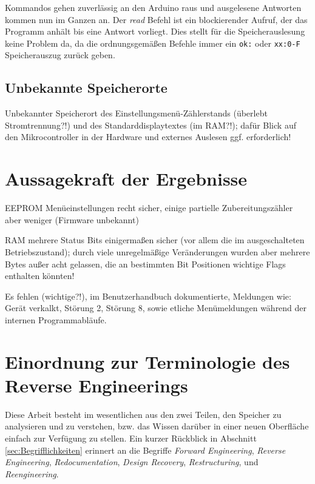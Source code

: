 Kommandos gehen zuverlässig an den Arduino raus und ausgelesene Antworten kommen nun im Ganzen an. Der \textit{read} Befehl ist ein blockierender Aufruf, der das Programm anhält bis eine Antwort vorliegt. Dies stellt für die Speicherauslesung keine Problem da, da die ordnungsgemäßen Befehle immer ein \texttt{ok:} oder \texttt{xx:0-F} Speicherauszug zurück geben.

\subsection{Unbekannte Speicherorte}
Unbekannter Speicherort des Einstellungsmenü-Zählerstands (überlebt Stromtrennung?!) und des Standarddisplaytextes (im RAM?!); dafür Blick auf den Mikrocontroller in der Hardware \cite{JuraMicrocontroller} und externes Auslesen ggf. erforderlich!

\section{Aussagekraft der Ergebnisse}
EEPROM Menüeinstellungen recht sicher, einige partielle Zubereitungszähler aber weniger (Firmware unbekannt)

RAM mehrere Status Bits einigermaßen sicher (vor allem die im ausgeschalteten Betriebszustand); durch viele unregelmäßige Veränderungen wurden aber mehrere Bytes außer acht gelassen, die an bestimmten Bit Positionen wichtige Flags enthalten könnten!

Es fehlen (wichtige?!), im Benutzerhandbuch dokumentierte, Meldungen wie:\label{FehlendeMeldungen}
Gerät verkalkt, Störung 2, Störung 8, sowie etliche Menümeldungen während der internen Programmabläufe.

\section{Einordnung zur Terminologie des Reverse Engineerings}\label{sec:DiskussionBegriffReverseEngineering}
Diese Arbeit besteht im wesentlichen aus den zwei Teilen, den Speicher zu analysieren und zu verstehen, bzw. das Wissen darüber in einer neuen Oberfläche einfach zur Verfügung zu stellen. Ein kurzer Rückblick in Abschnitt \ref{sec:Begrifflichkeiten} erinnert an die Begriffe \textit{Forward Engineering}, \textit{Reverse Engineering}, \textit{Redocumentation}, \textit{Design Recovery}, \textit{Restructuring}, und \textit{Reengineering}.

